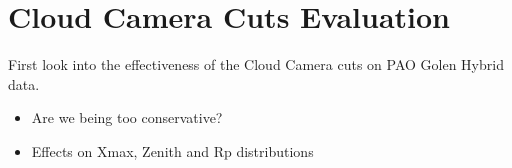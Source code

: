 \chapter{Cloud Camera Cuts Evaluation}\label{Ch:CloudCuts}

First look into the effectiveness of the Cloud Camera cuts on PAO Golen Hybrid data.
\begin{itemize}
\item Are we being too conservative?
\item Effects on Xmax, Zenith and Rp distributions
\end{itemize}  